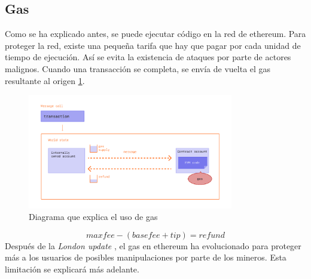 \subsection{Gas}
Como se ha explicado antes, se puede ejecutar código en la red de ethereum. Para proteger la red, existe una pequeña tarifa que hay que pagar por cada unidad de tiempo de ejecución. Así se evita la existencia de ataques por parte de actores malignos. Cuando una transacción se completa, se envía de vuelta el gas resultante al origen \ref{fg:message_diagram}.
\begin{figure}[h!]
    \centering
    \includegraphics[width=0.8\textwidth]{Figures/gas-tx.png}
    \caption{Diagrama que explica el uso de gas}
    \label{fg:message_diagram}
\end{figure}
\begin{equation}
    max fee - (base fee + tip) = refund
\end{equation}
Después de la \textit{London update} \cite{web:london}, el gas en ethereum ha evolucionado para proteger más a los usuarios de posibles manipulaciones por parte de los mineros. Esta limitación se explicará más adelante.
